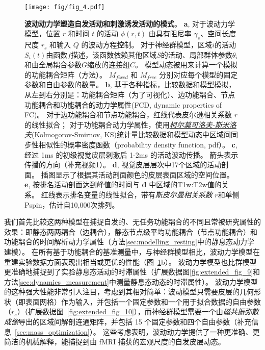 \documentclass[lang=cn,a4paper,newtx,citestyle=gb7714-2015, bibstyle=gb7714-2015]{elegantpaper}
\begin{document}
\begin{figure}[!htb]
	\centering
	\texttt{[image: fig/fig\_4.pdf]}
	\caption{\textbf{波动动力学塑造自发活动和刺激诱发活动的模式}。
	\textbf{a}, 对于波动力学模型，位置 $ r $ 和时间 $ t $ 的活动 $ \phi(r,t) $ 由具有阻尼率 $ \gamma_s $、空间长度尺度 $ r_s $ 和输入 $ Q $ 的波动方程控制。
	对于神经群模型，区域$ i $的活动$ S_i(t) $由函数$ f $描述，该函数依赖其他区域$ S $的活动、局部群体参数$ \theta_i $和由全局耦合参数$ G $缩放的连接组$ C $。
	模型动态被用来计算一个模拟的功能耦合矩阵（方法）。
	$ M_{fixed} $ 和 $ M_{free} $ 分别对应每个模型的固定参数和自由参数的数量。
	\textbf{b}, 基于各种指标，比较数据和模型模拟，从左到右分别是：功能耦合矩阵（为了可视化）、边功能耦合、节点功能耦合和功能耦合的动力学属性(FCD, dynamic properties of FC)。
	对于边功能耦合和节点功能耦合，红线代表皮尔逊相关系数 $ r $ 的线性拟合；
	对于功能耦合动力学属性，使用\textit{\href{https://www.cnblogs.com/jiangkejie/p/11572205.html}{柯尔莫可洛夫-斯米洛夫}}(Kolmogorov-Smirnov, KS)统计量比较数据和模型动态中区域间同步性相似性的概率密度函数（probability density function, pdf）。
	\textbf{c}, 经过 1ms 的初级视觉皮层刺激后 1-2ms 的活动波动传播。
	箭头表示传播的方向（补充视频1）。
	\textbf{d}, 视觉皮层层次中17个区域的活动剖面。
	插图显示了根据其活动剖面颜色的皮层表面区域的空间位置。
	\textbf{e}, 按排名活动剖面达到峰值的时间与 \textbf{d} 中区域的T1w:T2w值的关系。
	红线表示排名变量的线性拟合，带有\textit{斯皮尔曼相关系数} $ r $和单侧Pspin，估计自10,000次排列。
	} \label{fig:4}
\end{figure}


我们首先比较这两种模型在捕捉自发的、无任务功能耦合的不同且常被研究属性的效果：即静态两两耦合（边耦合），静态节点级平均功能耦合（节点功能耦合）和功能耦合的时间解析动力学属性（方法\ref{sec:modelling_resting}中的静息态动力学建模）。
在所有基于功能耦合的基准测量中，与神经群模型相比，波动力学模型在重建实验数据方面表现出相当或更优的性能（图~\ref{fig:4}b）。
波动力学模型也比群模型更准确地捕捉到了实验静息态活动的时滞属性\cite{raut2021global,bolt2022parsimonious,mitra2015lag}（扩展数据图\ref{fig:extended_fig_9}和方法\ref{sec:dynamics_measurement}中测量静息态动态的时滞属性）。
波动力学模型的这种强大性能非常引人注目，考虑到其相对简单：波动模型只需要皮层的几何形状（即表面网格）作为输入，并包括一个固定参数和一个用于拟合数据的自由参数（$ r_s $）（扩展数据图~\ref{fig:extended_fig_10}），而神经群模型需要一个由\textit{磁共振弥散成像}导出的区域间解剖连通矩阵，并包括 15 个固定参数和四个自由参数（补充信息~\ref{sec:mass_optimization}）。
这些考虑表明，波动动力学提供了一种更准确、更简洁的机械解释，能捕捉到由 fMRI 捕获的宏观尺度的自发皮层动态。
\end{document}
